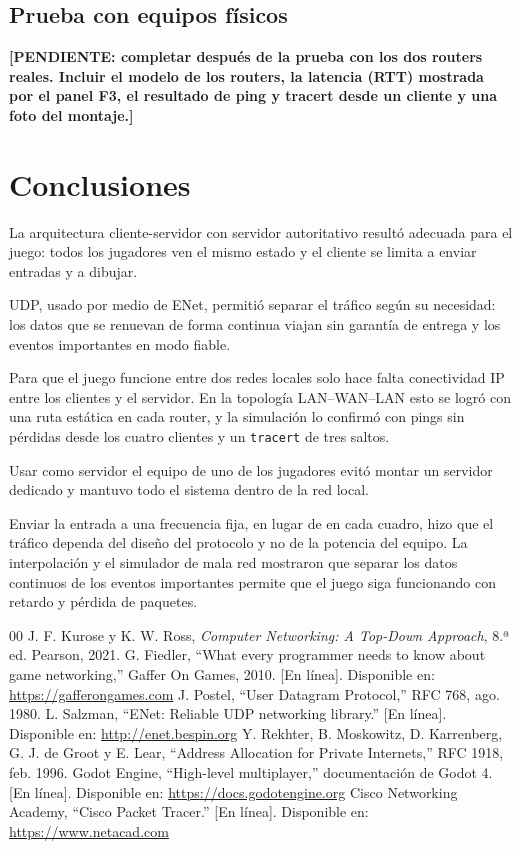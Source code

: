 \documentclass[conference]{IEEEtran}
\begin{document}
\subsection{Prueba con equipos físicos}
\textbf{[PENDIENTE: completar después de la prueba con los dos routers reales.
Incluir el modelo de los routers, la latencia (RTT) mostrada por el panel F3, el
resultado de ping y tracert desde un cliente y una foto del montaje.]}

\section{Conclusiones}
La arquitectura cliente-servidor con servidor autoritativo resultó adecuada para
el juego: todos los jugadores ven el mismo estado y el cliente se limita a
enviar entradas y a dibujar.

UDP, usado por medio de ENet, permitió separar el tráfico según su necesidad:
los datos que se renuevan de forma continua viajan sin garantía de entrega y los
eventos importantes en modo fiable.

Para que el juego funcione entre dos redes locales solo hace falta conectividad
IP entre los clientes y el servidor. En la topología LAN--WAN--LAN esto se logró
con una ruta estática en cada router, y la simulación lo confirmó con pings sin
pérdidas desde los cuatro clientes y un \texttt{tracert} de tres saltos.

Usar como servidor el equipo de uno de los jugadores evitó montar un servidor
dedicado y mantuvo todo el sistema dentro de la red local.

Enviar la entrada a una frecuencia fija, en lugar de en cada cuadro, hizo que el
tráfico dependa del diseño del protocolo y no de la potencia del equipo. La
interpolación y el simulador de mala red mostraron que separar los datos
continuos de los eventos importantes permite que el juego siga funcionando con
retardo y pérdida de paquetes.

\begin{thebibliography}{00}
 J. F. Kurose y K. W. Ross, \emph{Computer Networking: A
Top-Down Approach}, 8.ª ed. Pearson, 2021.
 G. Fiedler, ``What every programmer needs to know about game
networking,'' Gaffer On Games, 2010. [En línea]. Disponible en:
\url{https://gafferongames.com}
 J. Postel, ``User Datagram Protocol,'' RFC 768, ago. 1980.
 L. Salzman, ``ENet: Reliable UDP networking library.'' [En
línea]. Disponible en: \url{http://enet.bespin.org}
 Y. Rekhter, B. Moskowitz, D. Karrenberg, G. J. de Groot y E.
Lear, ``Address Allocation for Private Internets,'' RFC 1918, feb. 1996.
 Godot Engine, ``High-level multiplayer,'' documentación de
Godot 4. [En línea]. Disponible en: \url{https://docs.godotengine.org}
 Cisco Networking Academy, ``Cisco Packet Tracer.'' [En línea].
Disponible en: \url{https://www.netacad.com}
\end{thebibliography}
\end{document}
